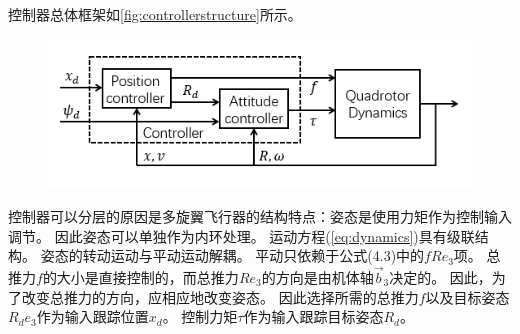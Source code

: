 \documentclass[
  type=master
]{gdutthesis}
\begin{document}
控制器总体框架如\autoref{fig:controllerstructure}所示。
\begin{figure}[htbp]
	\centering
	\includegraphics[width=1.0\textwidth]{屏幕截图 2022-04-04 222027.png}
	\label{fig:controllerstructure}
\end{figure}
控制器可以分层的原因是多旋翼飞行器的结构特点：姿态是使用力矩作为控制输入调节。
因此姿态可以单独作为内环处理。
运动方程(\autoref{eq:dynamics})具有级联结构。
姿态的转动运动与平动运动解耦。
平动只依赖于公式(4.3)中的$fRe_3$项。
总推力$f$的大小是直接控制的，而总推力$Re_3$的方向是由机体轴$\vec{b}_3$决定的。
因此，为了改变总推力的方向，应相应地改变姿态。
因此选择所需的总推力$f$以及目标姿态$R_d e_3$作为输入跟踪位置$x_d$。
控制力矩$\tau$作为输入跟踪目标姿态$R_d$。
\end{document}
